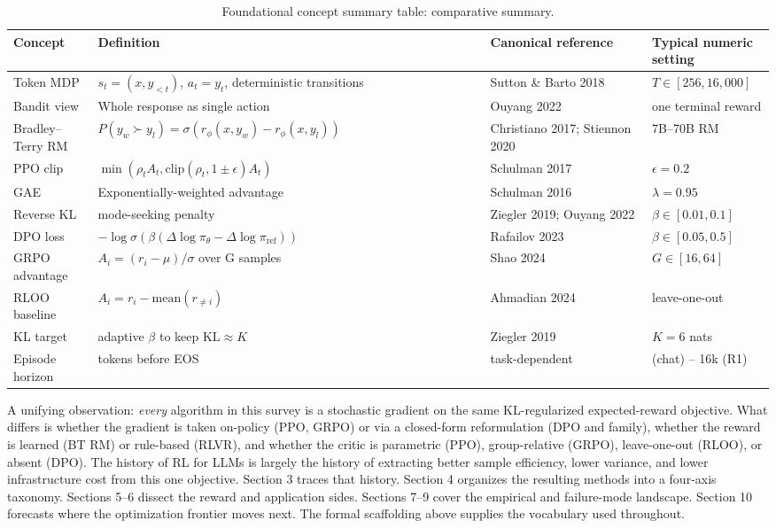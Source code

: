 \documentclass{article}
\begin{document}
\begin{table}[t]
\centering
\caption{Foundational concept summary table: comparative summary.}
\label{tab:foundational-concept-summary-table}
\begin{tabular}{>{\raggedright\arraybackslash}p{0.1135\linewidth}
  >{\raggedright\arraybackslash}p{0.5106\linewidth}
  >{\raggedright\arraybackslash}p{0.2128\linewidth}
  >{\raggedright\arraybackslash}p{0.1631\linewidth}}
\toprule
Concept & Definition & Canonical reference & Typical numeric setting \\
\midrule
Token MDP & \(s_t = (x, y_{<t})\), \(a_t = y_t\), deterministic transitions & Sutton \& Barto 2018 & \(T \in [256, 16{,}000]\) \\
Bandit view & Whole response as single action & Ouyang 2022 & one terminal reward \\
Bradley--Terry RM & \(P(y_w \succ y_l) = \sigma(r_\phi(x, y_w) - r_\phi(x, y_l))\) & Christiano 2017; Stiennon 2020 & 7B--70B RM \\
PPO clip & \(\min(\rho_t A_t, \mathrm{clip}(\rho_t, 1\pm\epsilon)A_t)\) & Schulman 2017 & \(\epsilon = 0.2\) \\
GAE & Exponentially-weighted advantage & Schulman 2016 & \(\lambda = 0.95\) \\
Reverse KL & mode-seeking penalty & Ziegler 2019; Ouyang 2022 & \(\beta \in [0.01, 0.1]\) \\
DPO loss & \(-\log \sigma(\beta(\Delta\log\pi_\theta - \Delta\log\pi_{\text{ref}}))\) & Rafailov 2023 & \(\beta \in [0.05, 0.5]\) \\
GRPO advantage & \(A_i = (r_i - \mu)/\sigma\) over G samples & Shao 2024 & \(G \in [16, 64]\) \\
RLOO baseline & \(A_i = r_i - \mathrm{mean}(r_{\neq i})\) & Ahmadian 2024 & leave-one-out \\
KL target & adaptive \(\beta\) to keep \(\mathrm{KL} \approx K\) & Ziegler 2019 & \(K = 6\) nats \\
Episode horizon & tokens before EOS & task-dependent & 256 (chat) -- 16k (R1) \\
\end{tabular}
\end{table}

A unifying observation: \emph{every} algorithm in this survey is a stochastic gradient on the same KL-regularized expected-reward objective. What differs is whether the gradient is taken on-policy (PPO, GRPO) or via a closed-form reformulation (DPO and family), whether the reward is learned (BT RM) or rule-based (RLVR), and whether the critic is parametric (PPO), group-relative (GRPO), leave-one-out (RLOO), or absent (DPO). The history of RL for LLMs is largely the history of extracting better sample efficiency, lower variance, and lower infrastructure cost from this one objective. Section 3 traces that history. Section 4 organizes the resulting methods into a four-axis taxonomy. Sections 5--6 dissect the reward and application sides. Sections 7--9 cover the empirical and failure-mode landscape. Section 10 forecasts where the optimization frontier moves next. The formal scaffolding above supplies the vocabulary used throughout.
\end{document}
